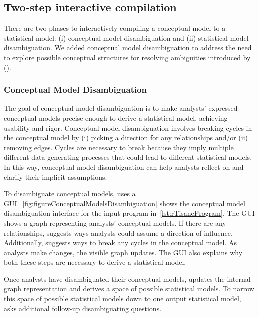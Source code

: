 \subsection{Two-step interactive compilation}
There are two phases to interactively compiling a conceptual model to a
statistical model: (i) conceptual model disambiguation and (ii) statistical
model disambiguation. We added conceptual model disambiguation to address the
need to explore possible conceptual structures for resolving ambiguities
introduced by \relates (\considerPossibilities).

\subsubsection{Conceptual Model Disambiguation} \label{subsec:conceptualModelDisambig} 
\conceptualModelDisambiguation
The goal of conceptual model disambiguation is to make analysts' expressed
conceptual models precise enough to derive a statistical model, achieving
usability and rigor. Conceptual model disambiguation involves breaking cycles in
the conceptual model by (i) picking a direction for any \relates relationships
and/or (ii) removing edges. Cycles are necessary to break because they imply
multiple different data generating processes that could lead to different
statistical models. In this way, conceptual model disambiguation can help analysts
reflect on and clarify their implicit assumptions. 

To disambiguate conceptual models, \rTisane uses a GUI.~\autoref{fig:figureConceptualModelsDisambiguation} shows the conceptual model disambiguation interface for the input program in~\autoref{lst:rTisaneProgram}. The GUI shows a graph
representing analysts' conceptual models. If there are any \relates
relationships, \rTisane suggests ways analysts could assume a direction of
influence. Additionally, \rTisane suggests ways to break any cycles in the
conceptual model. As analysts make changes, the visible graph updates. The GUI
also explains why both these steps are necessary to derive a statistical model. 

Once analysts have disambiguated their conceptual models, \rTisane updates the
internal graph representation and derives a space of possible statistical
models. To narrow this space of possible statistical models down to one output
statistical model, \rTisane asks additional follow-up disambiguating questions. 

\begin{comment}
This problem is actually challenging because detecting all cycles in a graph is
an NP-hard problem. We adapt a version of Johnson's(?) algorithm.
\end{comment}

